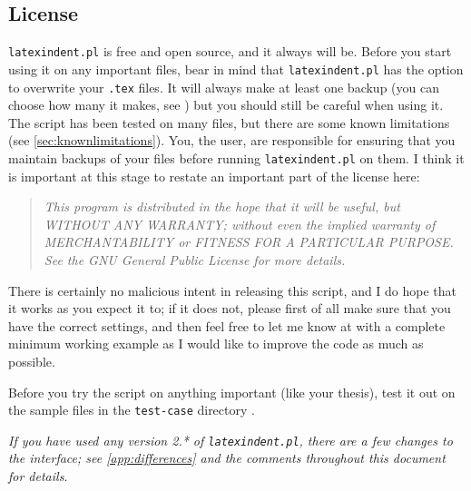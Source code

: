 \subsection{License}
	\texttt{latexindent.pl} is free and open source, and it always will be.
	Before you start using it on any important files, bear in mind that \texttt{latexindent.pl} has the option to overwrite your \texttt{.tex} files.
	It will always make at least one backup (you can choose how many it makes, see )
	but you should still be careful when using it. The script has been tested on many
	files, but there are some known limitations (see \cref{sec:knownlimitations}).
	You, the user, are responsible for ensuring that you maintain backups of your files
	before running \texttt{latexindent.pl} on them. I think it is important at this
	stage to restate an important part of the license here:
	\begin{quote}\itshape
		This program is distributed in the hope that it will be useful,
		but WITHOUT ANY WARRANTY; without even the implied warranty of
		MERCHANTABILITY or FITNESS FOR A PARTICULAR PURPOSE.  See the
		GNU General Public License for more details.
	\end{quote}
	There is certainly no malicious intent in releasing this script, and I do hope
	that it works as you expect it to; if it does not, please first of all
	make sure that you have the correct settings, and then feel free to let me know at \cite{latexindent-home} with a
	complete minimum working example as I would like to improve the code as much as possible.
	\begin{warning}
		Before you try the script on anything important (like your thesis), test it
		out on the sample files in the \texttt{test-case} directory \cite{latexindent-home}.
	\end{warning}

	\emph{If you have used any version 2.* of \texttt{latexindent.pl}, there
		are a few changes to the interface; see \vref{app:differences} and the comments
		throughout this document for details}.
